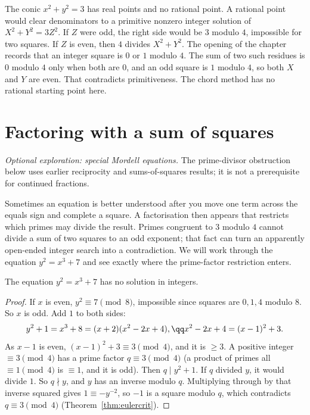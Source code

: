 \begin{examplex}
The conic $x^2+y^2=3$ has real points and no rational point. A rational point would clear denominators to a primitive nonzero integer solution of $X^2+Y^2=3Z^2$. If $Z$ were odd, the right side would be $3$ modulo $4$, impossible for two squares. If $Z$ is even, then $4$ divides $X^2+Y^2$. The opening of the chapter records that an integer square is $0$ or $1$ modulo $4$. The sum of two such residues is $0$ modulo $4$ only when both are $0$, and an odd square is $1$ modulo $4$, so both $X$ and $Y$ are even. That contradicts primitiveness. The chord method has no rational starting point here.
\end{examplex}

\section{Factoring with a sum of squares}

\emph{Optional exploration: special Mordell equations.} The prime-divisor
obstruction below uses earlier reciprocity and sums-of-squares results;
it is not a prerequisite for continued fractions.

Sometimes an equation is better understood after you move one term across the equals sign and complete a square. A factorisation then appears that restricts which primes may divide the result. Primes congruent to $3$ modulo $4$ cannot divide a sum of two squares to an odd exponent; that fact can turn an apparently open-ended integer search into a contradiction. We will work through the equation $y^2=x^3+7$ and see exactly where the prime-factor restriction enters.

\begin{theorem}\label{thm:mordell7}
The equation $y^2=x^3+7$ has no solution in integers.
\end{theorem}
\begin{proof}
If $x$ is even, $y^2\equiv7\pmod8$, impossible since squares are $0,1,4$ modulo $8$. So $x$ is odd. Add $1$ to both sides:
\[
\begin{gathered}y^2+1=x^3+8=(x+2)(x^2-2x+4),\qq x^2-2x+4=(x-1)^2+3.\end{gathered}
\]
As $x-1$ is even, $(x-1)^2+3\equiv3\pmod4$, and it is $\ge3$. A positive integer $\equiv3\pmod4$ has a prime factor $q\equiv3\pmod4$ (a product of primes all $\equiv1\pmod4$ is $\equiv1$, and it is odd). Then $q\mid y^2+1$. If $q$ divided $y$, it would divide $1$. So $q\nmid y$, and $y$ has an inverse modulo $q$. Multiplying through by that inverse squared gives $1\equiv -y^{-2}$, so $-1$ is a square modulo $q$, which contradicts $q\equiv3\pmod4$ (Theorem~\ref{thm:eulercrit}).
\end{proof}

